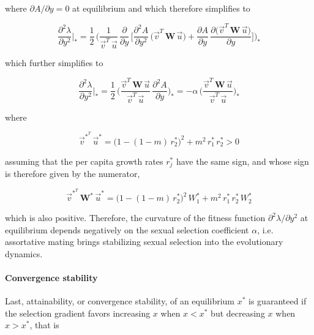 where $\partial A / \partial y = 0$ at equilibrium and which therefore simplifies to

\begin{equation}
    \frac{\partial^2 \lambda}{\partial y^2}\bigg|_* = \frac{1}{2}\,\Bigg(\frac{1}{\overrightarrow{v}^T\,\overrightarrow{u}}\,\frac{\partial}{\partial y}\,\bigg[\frac{\partial^2 A}{\partial y^2}\,\Big(\overrightarrow{v}^T\,\pmb W\,\overrightarrow{u}\Big)+\frac{\partial A}{\partial y}\,\frac{\partial \big(\overrightarrow{v}^T\,\pmb W\,\overrightarrow{u}\big)}{\partial y}\bigg]\Bigg)_*
\end{equation}

which further simplifies to

\begin{equation}
    \frac{\partial^2 \lambda}{\partial y^2}\bigg|_* = \frac{1}{2}\,\Bigg(\frac{\overrightarrow{v}^T\,\pmb W\,\overrightarrow{u}}{\overrightarrow{v}^T\,\overrightarrow{u}}\,\frac{\partial^2 A}{\partial y}\Bigg)_* = -\alpha \, \Bigg(\frac{\overrightarrow{v}^T\,\pmb W\,\overrightarrow{u}}{\overrightarrow{v}^T\,\overrightarrow{u}}\Bigg)_*
    \label{eq:curvature_final}
\end{equation}

where 

\begin{equation}
    \overrightarrow{v}^*^T\,\overrightarrow{u}^* = \big(1-(1-m)\,r^*_2\big)^2 + m^2\,r^*_1\,r^*_2 > 0
\end{equation}

assuming that the per capita growth rates $r^*_j$ have the same sign, and whose sign is therefore given by the numerator,

\begin{equation}
    \overrightarrow{v}^*^T\,\pmb W^*\,\overrightarrow{u}^* = \big(1-(1-m)\,r^*_2\big)^2\,W^*_1 + m^2\,r^*_1\,r^*_2\,W^*_2
\end{equation}

which is also positive. Therefore, the curvature of the fitness function $\partial^2 \lambda / \partial y^2$ at equilibrium depends negatively on the sexual selection coefficient $\alpha$, i.e. assortative mating brings stabilizing sexual selection into the evolutionary dynamics.

\paragraph{Convergence stability} Last, attainability, or convergence stability, of an equilibrium $x^*$ is guaranteed if the selection gradient favors increasing $x$ when $x < x^*$ but decreasing $x$ when $x > x^*$, that is

